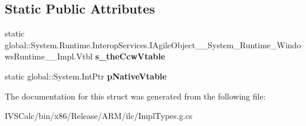 \subsection*{Static Public Attributes}
\begin{DoxyCompactItemize}
\item 
\mbox{\label{struct_system_1_1_runtime_1_1_interop_services_1_1_i_agile_object_____system___runtime___windows_runtime_____impl_1_1_vtbl_a2a0b60829c25a55279076c9a024225ba}} 
static global\+::\+System.\+Runtime.\+Interop\+Services.\+I\+Agile\+Object\+\_\+\+\_\+\+System\+\_\+\+Runtime\+\_\+\+Windows\+Runtime\+\_\+\+\_\+\+Impl.\+Vtbl {\bfseries s\+\_\+the\+Ccw\+Vtable}
\item 
\mbox{\label{struct_system_1_1_runtime_1_1_interop_services_1_1_i_agile_object_____system___runtime___windows_runtime_____impl_1_1_vtbl_a1a7ce93a6655f3cad52010c495334d71}} 
static global\+::\+System.\+Int\+Ptr {\bfseries p\+Native\+Vtable}
\end{DoxyCompactItemize}


The documentation for this struct was generated from the following file\+:\begin{DoxyCompactItemize}
\item 
I\+V\+S\+Calc/bin/x86/\+Release/\+A\+R\+M/ilc/Impl\+Types.\+g.\+cs\end{DoxyCompactItemize}
